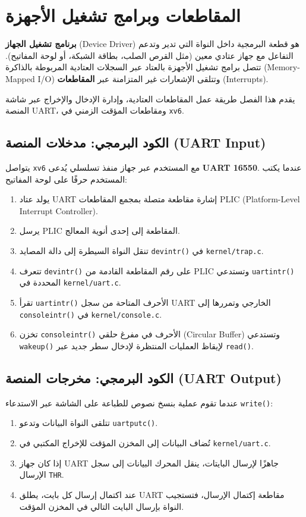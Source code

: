 \chapter{المقاطعات وبرامج تشغيل الأجهزة}
\label{CH:INTERRUPT}

\textbf{برنامج تشغيل الجهاز} (Device Driver) هو قطعة البرمجية داخل النواة التي تدير وتدعم التفاعل مع جهاز عتادي معين (مثل القرص الصلب، بطاقة الشبكة، أو لوحة المفاتيح).
تتصل برامج تشغيل الأجهزة بالعتاد عبر السجلات العتادية المربوطة بالذاكرة (Memory-Mapped I/O) وتتلقى الإشعارات غير المتزامنة عبر \textbf{المقاطعات} (Interrupts).

يقدم هذا الفصل طريقة عمل المقاطعات العتادية، وإدارة الإدخال والإخراج عبر شاشة المنصة UART، ومقاطعات المؤقت الزمني في \texttt{xv6}.

\section{الكود البرمجي: مدخلات المنصة (UART Input)}
\label{sec:code_console_input}

يتواصل \texttt{xv6} مع المستخدم عبر جهاز منفذ تسلسلي يُدعى \textbf{UART 16550}.
عندما يكتب المستخدم حرفًا على لوحة المفاتيح:
\begin{enumerate}
  \item يولد عتاد UART إشارة مقاطعة متصلة بمجمع المقاطعات PLIC (Platform-Level Interrupt Controller).
  \item يرسل PLIC المقاطعة إلى إحدى أنوية المعالج.
  \item تنقل النواة السيطرة إلى دالة المصايد \texttt{devintr()} في \texttt{kernel/trap.c}.
  \item تتعرف \texttt{devintr()} على رقم المقاطعة القادمة من PLIC وتستدعي \texttt{uartintr()} المحددة في \texttt{kernel/uart.c}.
  \item تقرأ \texttt{uartintr()} الأحرف المتاحة من سجل UART الخارجي وتمررها إلى \texttt{consoleintr()} في \texttt{kernel/console.c}.
  \item تخزن \texttt{consoleintr()} الأحرف في مفرغ حلقي (Circular Buffer) وتستدعي \texttt{wakeup()} لإيقاظ العمليات المنتظرة لإدخال سطر جديد عبر \texttt{read()}.
\end{enumerate}

\section{الكود البرمجي: مخرجات المنصة (UART Output)}
\label{sec:code_console_output}

عندما تقوم عملية بنسخ نصوص للطباعة على الشاشة عبر الاستدعاء \texttt{write()}:
\begin{enumerate}
  \item تتلقى النواة البيانات وتدعو \texttt{uartputc()}.
  \item تُضاف البيانات إلى المخزن المؤقت للإخراج المكتبي في \texttt{kernel/uart.c}.
  \item إذا كان جهاز UART جاهزًا لإرسال البايتات، ينقل المحرك البيانات إلى سجل الإرسال \texttt{THR}.
  \item عند اكتمال إرسال كل بايت، يطلق UART مقاطعة إكتمال الإرسال، فتستجيب النواة بإرسال البايت التالي في المخزن المؤقت.
\end{enumerate}


